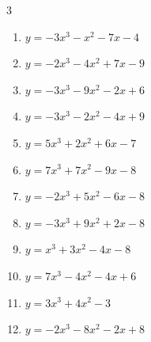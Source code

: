 \begin{multicols}{3}
\begin{enumerate}

  \item $y=-3x^{3}-x^{2}-7x-4$


  \item $y=-2x^{3}-4x^{2}+7x-9$


  \item $y=-3x^{3}-9x^{2}-2x+6$


  \item $y=-3x^{3}-2x^{2}-4x+9$


  \item $y=5x^{3}+2x^{2}+6x-7$


  \item $y=7x^{3}+7x^{2}-9x-8$


  \item $y=-2x^{3}+5x^{2}-6x-8$


  \item $y=-3x^{3}+9x^{2}+2x-8$


  \item $y=x^{3}+3x^{2}-4x-8$


  \item $y=7x^{3}-4x^{2}-4x+6$


  \item $y=3x^{3}+4x^{2}-3$


  \item $y=-2x^{3}-8x^{2}-2x+8$



\end{enumerate}
\end{multicols}

